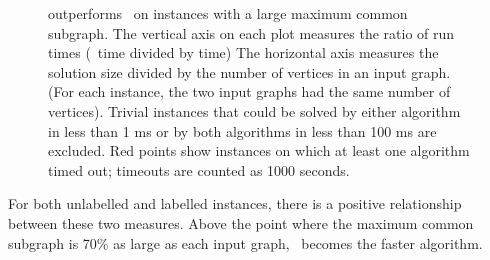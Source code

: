 \begin{figure}[htb]
    \centering
    \caption{\McSplit{$\downarrow$} outperforms \McSplit\ on instances with a large maximum common subgraph.
        The vertical axis on each plot measures the ratio of run times (\McSplit\ time divided by \McSplit{$\downarrow$} time)
        The horizontal axis measures the solution size divided by the number of vertices
        in an input graph.  (For each instance, the two input graphs had
        the same number of vertices).  Trivial instances that could be solved by either algorithm in less
        than 1 ms or by both algorithms in less than 100 ms are excluded.  Red points show instances
        on which at least one algorithm timed out; timeouts are counted as 1000
        seconds.}\label{figure:mcsplit-runtime-ratio-soln-size}
\end{figure}

For both unlabelled and labelled instances, there is a positive
relationship between these two measures. Above the point where the maximum
common subgraph is 70\% as large as each input graph, \McSplitDown\ becomes
the faster algorithm.

\FloatBarrier

